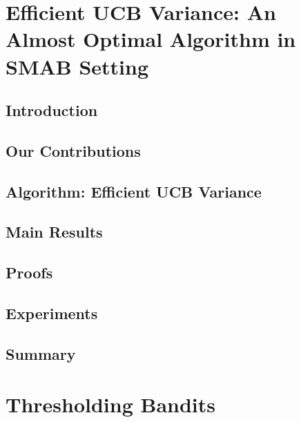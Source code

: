 \documentclass[MS,twoside]{iitmdiss}
\newcommand{\clearemptydoublepage}{\newpage{\cleardoublepage}}
\begin{document}
\chapter{Efficient UCB Variance: An Almost Optimal Algorithm in SMAB Setting}
\label{chap:EUCBV}

\section{Introduction}
\label{Chapter3:intro}



\section{Our Contributions}
\label{sec:contri}


\section{Algorithm: Efficient UCB Variance}
\label{sec:eucbv}


\section{Main Results} 
\label{sec:results}


\section{Proofs}
\label{sec:proofTheorem}


\section{Experiments}
\label{sec:expt}


\section{Summary}
\label{sec:conc}











\clearemptydoublepage
\chapter{Thresholding Bandits}
\label{chap:tbandit1}
\end{document}
